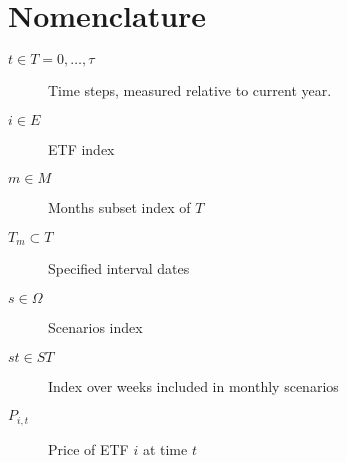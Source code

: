 \section{Nomenclature}
\begin{description}
\item[$t \in T = {0, \ldots, \tau}$]{Time steps, measured relative to current year.}
\item[$i \in E$]{ETF index}
\item[$m \in M$]{Months subset index of $T$}
\item[$T_m \subset T$]{Specified interval dates}
\item[$s \in \Omega$]{Scenarios index}
\item[$st \in ST$]{Index over weeks included in monthly scenarios}
\item[$P_{i,t}$]{Price of ETF $i$ at time $t$}
\end{description}

